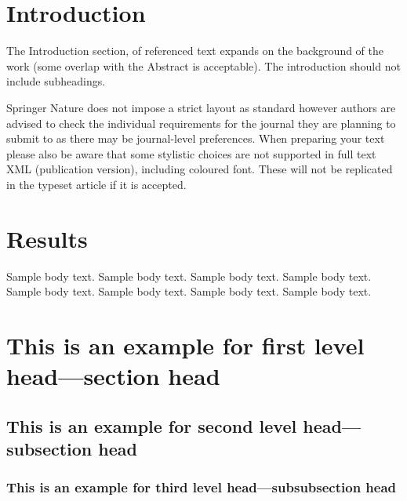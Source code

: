 \documentclass[sn-basic,pdflatex]{sn-jnl}
\theoremstyle{remark}
\theoremstyle{definition}
\begin{document}



\maketitle

\hypertarget{sec1}{%
\section{Introduction}\label{sec1}}

The Introduction section, of referenced text \citet{bib1} expands on the
background of the work (some overlap with the Abstract is acceptable).
The introduction should not include subheadings.

Springer Nature does not impose a strict layout as standard however
authors are advised to check the individual requirements for the journal
they are planning to submit to as there may be journal-level
preferences. When preparing your text please also be aware that some
stylistic choices are not supported in full text XML (publication
version), including coloured font. These will not be replicated in the
typeset article if it is accepted.

\hypertarget{sec2}{%
\section{Results}\label{sec2}}

Sample body text. Sample body text. Sample body text. Sample body text.
Sample body text. Sample body text. Sample body text. Sample body text.

\hypertarget{sec3}{%
\section{This is an example for first level head---section
head}\label{sec3}}

\hypertarget{subsec2}{%
\subsection{This is an example for second level head---subsection
head}\label{subsec2}}

\hypertarget{subsubsec2}{%
\subsubsection{This is an example for third level head---subsubsection
head}\label{subsubsec2}}
\end{document}
